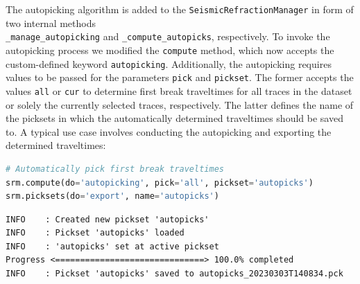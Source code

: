 \documentclass[a4paper,fleqn]{cas-sc}
\begin{document}
The autopicking algorithm is added to the \texttt{SeismicRefractionManager} in form of two internal methods\\ \texttt{\_manage\_autopicking} and \texttt{\_compute\_autopicks}, respectively. To invoke the autopicking process we modified the \texttt{compute} method, which now accepts the custom-defined keyword \texttt{autopicking}. Additionally, the autopicking requires values to be passed for the parameters \texttt{pick} and \texttt{pickset}. The former accepts the values \texttt{all} or \texttt{cur} to determine first break traveltimes for all traces in the dataset or solely the currently selected traces, respectively. The latter defines the name of the picksets in which the automatically determined traveltimes should be saved to. A typical use case involves conducting the autopicking and exporting the determined traveltimes:
\begin{lstlisting}[language=Python, firstnumber=24]
# Automatically pick first break traveltimes
srm.compute(do='autopicking', pick='all', pickset='autopicks')
srm.picksets(do='export', name='autopicks')
\end{lstlisting}
\begin{footnotesize}
\begin{verbatim}
INFO    : Created new pickset 'autopicks'
INFO    : Pickset 'autopicks' loaded
INFO    : 'autopicks' set at active pickset
Progress <==============================> 100.0% completed
INFO    : Pickset 'autopicks' saved to autopicks_20230303T140834.pck
\end{verbatim}
\end{footnotesize}
\end{document}
